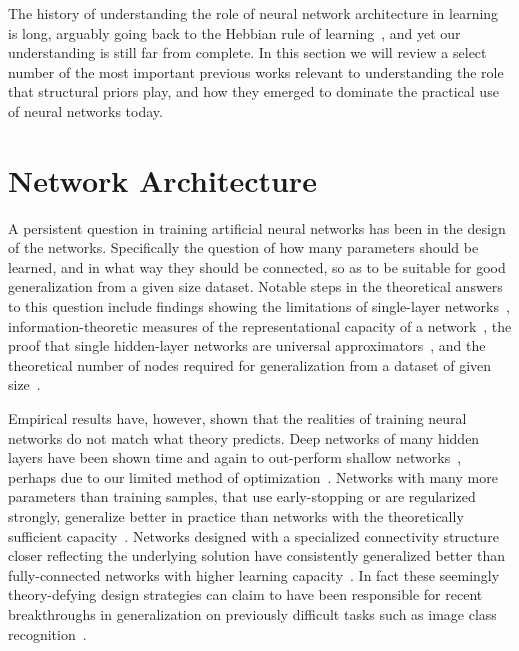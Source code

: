 \documentclass[thesis]{subfiles}
\begin{document}
	
	The history of understanding the role of neural network architecture in learning is long, arguably going back to the Hebbian rule of learning~\citep{hebb1949organization}, and yet our understanding is still far from complete. In this section we will review a select number of the most important previous works relevant to understanding the role that structural priors play, and how they emerged to dominate the practical use of neural networks today.
	
	\section{Network Architecture}
    A persistent question in training artificial neural networks has been in the design of the networks. Specifically the question of how many parameters should be learned, and in what way they should be connected,  so as to be suitable for good generalization from a given size dataset. Notable steps in the theoretical answers to this question include findings showing the limitations of single-layer networks~\citep{minsky1988perceptrons}, information-theoretic measures of the representational capacity of a network~\citep{vapnik2015uniform}, the proof that single hidden-layer networks are universal approximators~\citep{hornik89a}, and the theoretical number of nodes required for generalization from a dataset of given size~\citep{baum1989size}. 
    
    Empirical results have, however, shown that the realities of training neural networks do not match what theory predicts. Deep networks of many hidden layers have been shown time and again to out-perform shallow networks~\citep{Krizhevsky2012,Simonyan2014verydeep,He2015,He2016}, perhaps due to our limited method of optimization~\citep{NIPS2014_5484}. Networks with many more parameters than training samples, that use early-stopping or are regularized strongly, generalize better in practice than networks with the theoretically sufficient capacity~\citep{caruana2001overfitting, Krizhevsky2012, HintonTalk2015}. Networks designed with a specialized connectivity structure closer reflecting the underlying solution have consistently generalized better than fully-connected networks with higher learning capacity~\citep{lecun1989backpropagation,He2016}. In fact these seemingly theory-defying design strategies can claim to have been responsible for recent breakthroughs in generalization on previously difficult tasks such as image class recognition~\citep{Krizhevsky2012, HintonTalk2015}.
    
\end{document}
